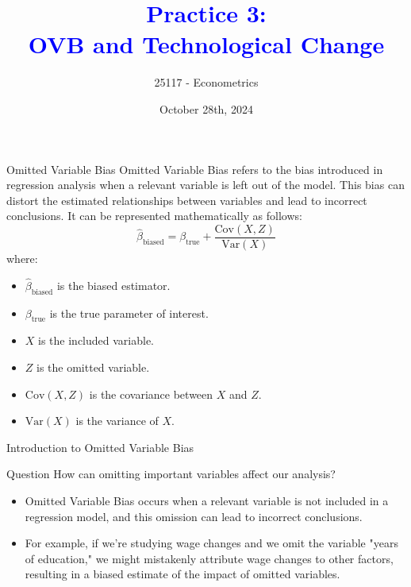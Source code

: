 \documentclass[notes,10pt, aspectratio=169]{beamer}
\title[]{\textcolor{blue}{Practice 3:\\OVB and Technological Change}}
\author{25117 - Econometrics}
\institute[shortinst]{Universitat Pompeu Fabra}
\date{October 28th, 2024}
\begin{document}

\begin{frame}[plain]
\maketitle
\end{frame}


\begin{frame}{Omitted Variable Bias}
Omitted Variable Bias refers to the bias introduced in regression analysis when a relevant variable is left out of the model. This bias can distort the estimated relationships between variables and lead to incorrect conclusions. It can be represented mathematically as follows:
  \[ \hat{\beta}_{\text{biased}} = \beta_{\text{true}} + \frac{{\text{Cov}(X, Z)}}{{\text{Var}(X)}}  \]
  where:
  \begin{itemize}
      \item \(\hat{\beta}_{\text{biased}}\) is the biased estimator.
      \item \(\beta_{\text{true}}\) is the true parameter of interest.
      \item \(X\) is the included variable.
      \item \(Z\) is the omitted variable.
      \item \(\text{Cov}(X, Z)\) is the covariance between \(X\) and \(Z\).
      \item \(\text{Var}(X)\) is the variance of \(X\).
  \end{itemize}
\end{frame}

\begin{frame}{Introduction to Omitted Variable Bias}
\begin{exampleblock}{Question}
    How can omitting important variables affect our analysis?
\end{exampleblock}
\begin{itemize}
  \item Omitted Variable Bias occurs when a relevant variable is not included in a regression model, and this omission can lead to incorrect conclusions.
  \item For example, if we're studying wage changes and we omit the variable "years of education," we might mistakenly attribute wage changes to other factors, resulting in a biased estimate of the impact of omitted variables.
\end{itemize}
\end{frame}
\end{document}
